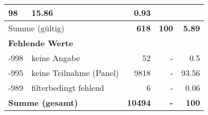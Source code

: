 \begin{longtable}{lXrrr}
       \num{98} &
       \num[round-mode=places,round-precision=2]{15,86} &
         \num[round-mode=places,round-precision=2]{0,93} \\
     \midrule
     \multicolumn{2}{l}{Summe (gültig)} &
       \textbf{\num{618}} &
     \textbf{100} &
       \textbf{\num[round-mode=places,round-precision=2]{5,89}} \\
     \multicolumn{5}{l}{\textbf{Fehlende Werte}}\\
       -998 &
       keine Angabe &
         \num{52} &
        - &
         \num[round-mode=places,round-precision=2]{0,5} \\
       -995 &
       keine Teilnahme (Panel) &
         \num{9818} &
        - &
         \num[round-mode=places,round-precision=2]{93,56} \\
       -989 &
       filterbedingt fehlend &
         \num{6} &
        - &
         \num[round-mode=places,round-precision=2]{0,06} \\
     \midrule
     \multicolumn{2}{l}{\textbf{Summe (gesamt)}} &
          \textbf{\num{10494}} &
        \textbf{-} &
        \textbf{100} \\
     \bottomrule
     \end{longtable}
     

